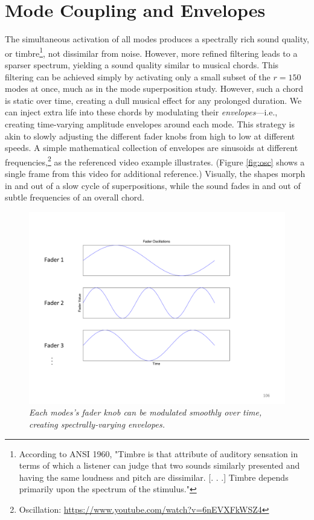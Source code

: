 \section{Mode Coupling and Envelopes}
The simultaneous activation of all modes produces a spectrally rich sound quality, or timbre\footnote{According to ANSI 1960,
"Timbre is that attribute of auditory sensation in terms of which a listener can judge that two sounds similarly presented and having the same loudness and pitch are dissimilar. [. . .] Timbre depends primarily upon the spectrum of the stimulus."}, not dissimilar from noise. However, more refined filtering leads to a sparser spectrum, yielding a sound quality similar to musical chords. This filtering
can be achieved simply by activating only a small subset of the $r = 150$ modes at once, much as in the mode superposition study. However, such a chord is static over time, creating a dull musical effect for any prolonged 
duration. We can inject extra life into these chords by modulating their {\em envelopes}---i.e., creating time-varying amplitude envelopes around each mode. This strategy is akin to slowly adjusting the different fader knobs 
from high to low at different speeds. A simple mathematical collection of envelopes are sinusoids at different frequencies,\footnote{Oscillation: \url{https://www.youtube.com/watch?v=6nEVXFkWSZ4}} as the referenced video example illustrates. 
(Figure \ref{fig:osc} shows a single frame from this video for additional reference.) Visually, the shapes morph in and out of a slow cycle of superpositions, while the sound fades in and out of subtle frequencies of an overall chord.

\begin{figure}[H]
	\centering
	\includegraphics[width=\textwidth]{chap6/figures/fader_envelopes.png}
	\caption{\em Each modes's fader knob can be modulated smoothly over time, creating spectrally-varying envelopes.}
\label{fig:fader_envs}
\end{figure}

